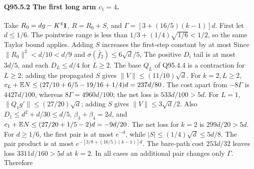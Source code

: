 \paragraph{Q95.5.2 The first long arm \(c_1=\allowbreak 4\).}
Take \(R_0=\allowbreak dg-K^4\mathbf1\), \(R=\allowbreak R_0+S\), and
\(\Gamma=\allowbreak [3+(16/5)(k-1)]d\). First let \(d\le\allowbreak 1/6\).
The pointwise range is less than
\(1/3+(1/4)\sqrt{1/6}<\allowbreak 1/2\), so the same Taylor bound applies.
Adding \(S\) increases the first-step constant by at most
Since \(\|R_0\|^2<\allowbreak d/10<\allowbreak d/9\) and
\(\sigma(\bar f_2)\le\allowbreak 6\sqrt d/5\),
The positive \(D_i\) tail is at most \(3d/5\), and each
\(D_L\le\allowbreak  d/4\) for \(L\ge\allowbreak 2\).
The base \(Q_L\) of Q95.4.4 is a contraction for \(L\ge\allowbreak 2\); adding
the propagated \(S\) gives \(\|V\|\le\allowbreak (11/10)\sqrt d\).
For \(k=\allowbreak 2,\allowbreak L\ge\allowbreak 2\),
\(c_L+\mathbb E N\le\allowbreak (27/10+6/5-19/16+1/4)d=\allowbreak 237d/80\).
The cost apart from \(-8\Gamma\) is \(4427d/100\), whereas
\(8\Gamma=\allowbreak 4960d/100\); the net loss is \(533d/100>\allowbreak 5d\).
For \(L=\allowbreak 1\), \(\|Q_1g'\|\le\allowbreak (27/20)\sqrt d\); adding \(S\) gives
\(\|V\|\le\allowbreak 3\sqrt d/2\). Also
\(D_1\le\allowbreak  d^2+d/30\le\allowbreak  d/5\), \(\beta_3+\beta_4=\allowbreak 2d\), and
\(c_1+\mathbb E N\le\allowbreak (27/20+1/5-2)d=\allowbreak -9d/20\).
The net loss for \(k=\allowbreak 2\) is \(299d/20>\allowbreak 5d\).
For \(d\ge\allowbreak 1/6\), the first pair is at most \(e^{-d}\), while
\(|S|\le\allowbreak (1/4)\sqrt d\le\allowbreak 5d/8\). The pair product is at most
\(e^{-[3/8+(16/5)(k-1)]d}\).
The bare-path cost \(253d/32\) leaves loss \(3311d/160>\allowbreak 5d\) at \(k=\allowbreak 2\).
In all cases an additional pair changes only \(\Gamma\). Therefore

